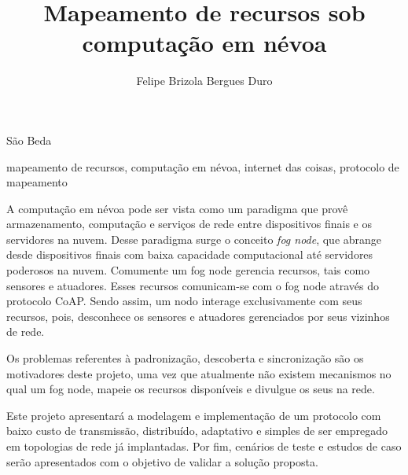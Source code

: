 \documentclass[portuguese,oneside]{tcc}
\author{Felipe Brizola Bergues Duro}
\title{Mapeamento de recursos sob computação em névoa}
        {Mapping resources under the fog computing}
\begin{document}
  
  
   {São Beda}
  
  
  
  \begin{resumo}{mapeamento de recursos, computação em névoa, internet das coisas, protocolo de mapeamento}

    A computação em névoa pode ser vista como um paradigma que provê armazenamento, computação e serviços de rede entre dispositivos finais e os servidores na nuvem.
    Desse paradigma surge o conceito \textit{fog node}, que abrange desde dispositivos finais com baixa capacidade computacional até servidores poderosos na nuvem.
    Comumente um fog node gerencia recursos, tais como sensores e atuadores.
    Esses recursos comunicam-se com o fog node através do protocolo CoAP.
    Sendo assim, um nodo interage exclusivamente com seus recursos, pois, desconhece os sensores e atuadores gerenciados por seus vizinhos de rede.

    Os problemas referentes à padronização, descoberta e sincronização são os motivadores deste projeto, uma vez que atualmente não existem mecanismos
    no qual um fog node, mapeie os recursos disponíveis e divulgue os seus na rede.

    Este projeto apresentará a modelagem e implementação de um protocolo com baixo custo de transmissão, distribuído, adaptativo e simples de ser empregado em topologias de rede já implantadas.
    Por fim, cenários de teste e estudos de caso serão apresentados com o objetivo de validar a solução proposta.
  
  \end{resumo}
  
\end{document}
